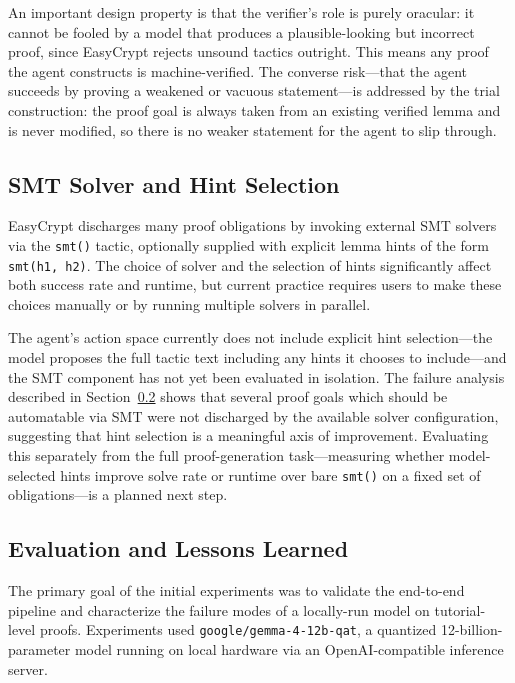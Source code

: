\documentclass[acmsmall,natbib=false]{acmart}
\begin{document}
An important design property is that the verifier's role is purely oracular: it cannot be fooled by a model that produces a plausible-looking but incorrect proof, since EasyCrypt rejects unsound tactics outright. This means any proof the agent constructs is machine-verified. The converse risk---that the agent succeeds by proving a weakened or vacuous statement---is addressed by the trial construction: the proof goal is always taken from an existing verified lemma and is never modified, so there is no weaker statement for the agent to slip through.

\subsection{SMT Solver and Hint Selection}

EasyCrypt discharges many proof obligations by invoking external SMT solvers via the \texttt{smt()} tactic, optionally supplied with explicit lemma hints of the form \texttt{smt(h1, h2)}. The choice of solver and the selection of hints significantly affect both success rate and runtime, but current practice requires users to make these choices manually or by running multiple solvers in parallel.

The agent's action space currently does not include explicit hint selection---the model proposes the full tactic text including any hints it chooses to include---and the SMT component has not yet been evaluated in isolation. The failure analysis described in Section~\ref{sec:eval} shows that several proof goals which should be automatable via SMT were not discharged by the available solver configuration, suggesting that hint selection is a meaningful axis of improvement. Evaluating this separately from the full proof-generation task---measuring whether model-selected hints improve solve rate or runtime over bare \texttt{smt()} on a fixed set of obligations---is a planned next step.

\subsection{Evaluation and Lessons Learned}
\label{sec:eval}

The primary goal of the initial experiments was to validate the end-to-end pipeline and characterize the failure modes of a locally-run model on tutorial-level proofs. Experiments used \texttt{google/gemma-4-12b-qat}, a quantized 12-billion-parameter model running on local hardware via an OpenAI-compatible inference server.
\end{document}
